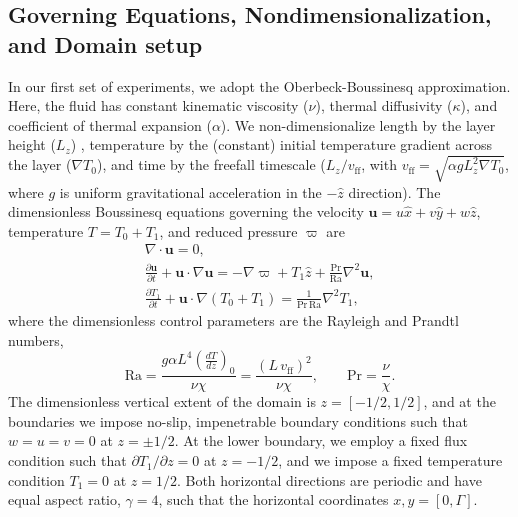 \documentclass[aps, pre, onecolumn, nofootinbib, notitlepage, groupedaddress, amsfonts, amssymb, amsmath, longbibliography]{revtex4-1}
\newcommand{\DivU}{\ensuremath{\nabla\cdot\bm{u}}}
\newcommand{\grad}{\ensuremath{\nabla}}
\begin{document}
\subsection{Governing Equations, Nondimensionalization, and Domain setup}
In our first set of experiments, we adopt the Oberbeck-Boussinesq approximation.  Here, the
fluid has constant kinematic viscosity ($\nu$), thermal diffusivity ($\kappa$), and coefficient
of thermal expansion ($\alpha$).  We non-dimensionalize length by the layer height ($L_z$) ,
temperature by the (constant) initial temperature gradient across the layer ($\grad T_0$), and time
by the freefall timescale ($L_z / v_{\text{ff}}$, with $v_{\text{ff}} = \sqrt{\alpha g L_z^2 \grad T_0}$, where $g$ is 
uniform gravitational acceleration in the $-\hat{z}$ direction). The dimensionless Boussinesq
equations governing the velocity $\bm{u} = u\hat{x} + v\hat{y} + w\hat{z}$, temperature
$T = T_0 + T_1$, and reduced pressure $\varpi$ are \cite{spiegel&veronis1960}
\begin{gather}
\DivU = 0, 
	\label{eqn:incompressible}
\\
\frac{\partial \bm{u}}{\partial t} + \bm{u}\cdot\grad\bm{u} =
-\grad\varpi + T_1\hat{z} + \frac{\text{Pr}}{\text{Ra}}\grad^2\bm{u}, 
	\label{eqn:bouss_momentum_eqn}
\\
\frac{\partial T_1}{\partial t} + \bm{u}\cdot\grad(T_0 + T_1) = \frac{1}{\text{Pr}\,\text{Ra}}\grad^2 T_1,
	\label{eqn:bouss_energy_eqn}
\end{gather}
where the dimensionless control parameters are the Rayleigh and Prandtl numbers,
\begin{equation}
\text{Ra} = \frac{g \alpha L^4 \left(\frac{dT}{dz}\right)_0}{\nu\chi} = \frac{(L\,v_{\text{ff}})^2}{\nu\chi}, \qquad \text{Pr} = \frac{\nu}{\chi}.
\end{equation}
The dimensionless vertical extent of the domain is $z = [-1/2, 1/2]$, and at the boundaries
we impose no-slip, impenetrable boundary conditions such that $w = u = v = 0$ at $z = \pm 1/2$.
At the lower boundary, we employ a fixed flux condition such that $\partial T_1 / \partial z = 0$
at $z = -1/2$, and we impose a fixed temperature condition $T_1 = 0$ at $z = 1/2$. Both
horizontal directions are periodic and have equal aspect ratio, $\gamma = 4$, such that
the horizontal coordinates $x, y = [0, \Gamma]$.
\end{document}
